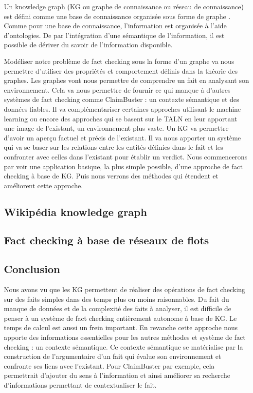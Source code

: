 Un knowledge graph (KG ou graphe de connaissance ou réseau de connaissance) est défini comme une base de connaissance organisée sous forme de graphe \cite{ehrlinger2016towards} \cite{JoStichburyKG}. Comme pour une base de connaissance, l'information est organisée à l'aide d'ontologies. De par l'intégration d'une sémantique de l'information, il est possible de dériver du savoir de l'information disponible. 

Modéliser notre problème de fact checking sous la forme d'un graphe va nous permettre d'utiliser des propriétés et comportement définis dans la théorie des graphes. Les graphes vont nous permettre de comprendre un fait en analysant son environnement. Cela va nous permettre de fournir ce qui manque à d'autres systèmes de fact checking comme ClaimBuster : un contexte sémantique et des données fiables. Il va complémentariser certaines approches utilisant le machine learning ou encore des approches qui se basent sur le TALN en leur apportant une image de l'existant, un environnement plus vaste. Un KG va permettre d'avoir un aperçu factuel et précis de l'existant. Il va nous apporter un système qui va se baser sur les relations entre les entités définies dans le fait et les confronter avec celles dans l'existant pour établir un verdict. 
Nous commencerons par voir une application basique, la plus simple possible, d'une approche de fact checking à base de KG. Puis nous verrons des méthodes qui étendent et améliorent cette approche.

\subsection{Wikipédia knowledge graph}


\label{sec:wkg}

\subsection{Fact checking à base de réseaux de flots} 



\subsection{Conclusion}

Nous avons vu que les KG permettent de réaliser des opérations de fact checking sur des faits simples dans des temps plus ou moins raisonnables. Du fait du manque de données et de la complexité des faits à analyser, il est difficile de penser à un système de fact checking entièrement autonome à base de KG. Le temps de calcul est aussi un frein important. En revanche cette approche nous apporte des informations essentielles pour les autres méthodes et système de fact checking : un contexte sémantique. Ce contexte sémantique se matérialise par la construction de l'argumentaire d'un fait qui évalue son environnement et confronte ses liens avec l'existant. Pour ClaimBuster par exemple, cela permettrait d'ajouter du sens à l'information et ainsi améliorer sa recherche d'informations permettant de contextualiser le fait.

